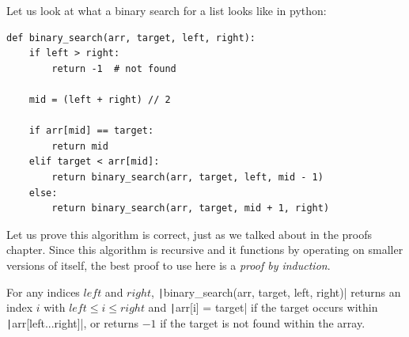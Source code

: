 Let us look at what a binary search for a list looks like in python:
\begin{verbatim}
def binary_search(arr, target, left, right):
    if left > right:
        return -1  # not found

    mid = (left + right) // 2

    if arr[mid] == target:
        return mid
    elif target < arr[mid]:
        return binary_search(arr, target, left, mid - 1)
    else:
        return binary_search(arr, target, mid + 1, right)
\end{verbatim}

Let us prove this algorithm is correct, just as we talked about in the proofs chapter. Since this algorithm is recursive and it functions by operating on smaller versions of itself, the best proof to use here is a \textit{proof by induction}.
\begin{theorem}
    For any indices $left$ and $right$, \texttt|binary_search(arr, target, left, right)| returns an index $i$ with $left \le i \le right$ and \texttt|arr[i] = target| if the target occurs within \texttt|arr[left...right]|, or returns $-1$ if the target is not found within the array.
\end{theorem}
